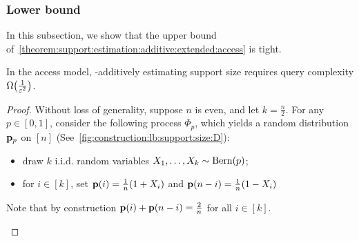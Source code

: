 \subsubsection{Lower bound}

In this subsection, we show that the upper bound of~\cref{theorem:support:estimation:additive:extended:access} is tight.

\begin{theorem}\label{theorem:tolerant:tester:support:size:lb} In the \pdfsamp access model, \eps-additively estimating support size requires query complexity $\bigOmega{\frac{1}{\eps^2}}$.
\end{theorem}
 \begin{proof}
Without loss of generality, suppose $n$ is even, and let $k=\frac{n}{2}$. For any $p\in[0,1]$, consider the following process $\Phi_p$, which yields a random distribution $\mathbf{p}_p$ on $[n]$ (See~\cref{fig:construction:lb:support:size:D}):
\begin{itemize}
  \item draw $k$ i.i.d. random variables $X_1,\dots, X_k\sim\operatorname{Bern}\!\left( p \right)$;
  \item for $i\in[k] $, set $\mathbf{p}(i)=\frac{1}{n}(1+X_i)$ and  $\mathbf{p}(n-i)=\frac{1}{n}(1-X_i)$
\end{itemize}
Note that by construction $\mathbf{p}(i)+\mathbf{p}(n-i)=\frac{2}{n}$ for all $i\in[k]$.

  \begin{figure}[!ht]\centering
\end{figure}
\end{proof}
